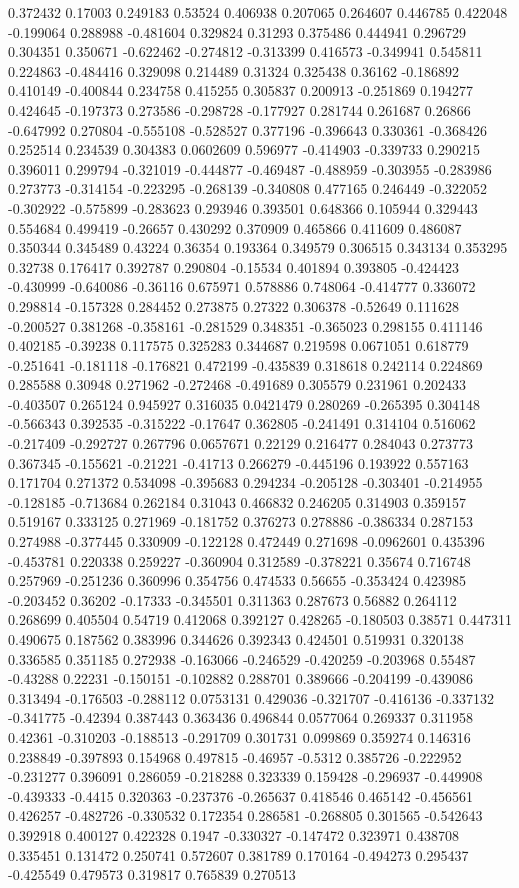 0.372432 0.17003 0.249183 0.53524 0.406938 0.207065 0.264607 0.446785 0.422048 -0.199064 0.288988 -0.481604 0.329824 0.31293 0.375486 0.444941 0.296729 0.304351 0.350671 -0.622462 -0.274812 -0.313399 0.416573 -0.349941 0.545811 0.224863 -0.484416 0.329098 0.214489 0.31324 0.325438 0.36162 -0.186892 0.410149 -0.400844 0.234758 0.415255 0.305837 0.200913 -0.251869 0.194277 0.424645 -0.197373 0.273586 -0.298728 -0.177927 0.281744 0.261687 0.26866 -0.647992 0.270804 -0.555108 -0.528527 0.377196 -0.396643 0.330361 -0.368426 0.252514 0.234539 0.304383 0.0602609 0.596977 -0.414903 -0.339733 0.290215 0.396011 0.299794 -0.321019 -0.444877 -0.469487 -0.488959 -0.303955 -0.283986 0.273773 -0.314154 -0.223295 -0.268139 -0.340808 0.477165 0.246449 -0.322052 -0.302922 -0.575899 -0.283623 0.293946 0.393501 0.648366 0.105944 0.329443 0.554684 0.499419 -0.26657 0.430292 0.370909 0.465866 0.411609 0.486087 0.350344 0.345489 0.43224 0.36354 0.193364 0.349579 0.306515 0.343134 0.353295 0.32738 0.176417 0.392787 0.290804 -0.15534 0.401894 0.393805 -0.424423 -0.430999 -0.640086 -0.36116 0.675971 0.578886 0.748064 -0.414777 0.336072 0.298814 -0.157328 0.284452 0.273875 0.27322 0.306378 -0.52649 0.111628 -0.200527 0.381268 -0.358161 -0.281529 0.348351 -0.365023 0.298155 0.411146 0.402185 -0.39238 0.117575 0.325283 0.344687 0.219598 0.0671051 0.618779 -0.251641 -0.181118 -0.176821 0.472199 -0.435839 0.318618 0.242114 0.224869 0.285588 0.30948 0.271962 -0.272468 -0.491689 0.305579 0.231961 0.202433 -0.403507 0.265124 0.945927 0.316035 0.0421479 0.280269 -0.265395 0.304148 -0.566343 0.392535 -0.315222 -0.17647 0.362805 -0.241491 0.314104 0.516062 -0.217409 -0.292727 0.267796 0.0657671 0.22129 0.216477 0.284043 0.273773 0.367345 -0.155621 -0.21221 -0.41713 0.266279 -0.445196 0.193922 0.557163 0.171704 0.271372 0.534098 -0.395683 0.294234 -0.205128 -0.303401 -0.214955 -0.128185 -0.713684 0.262184 0.31043 0.466832 0.246205 0.314903 0.359157 0.519167 0.333125 0.271969 -0.181752 0.376273 0.278886 -0.386334 0.287153 0.274988 -0.377445 0.330909 -0.122128 0.472449 0.271698 -0.0962601 0.435396 -0.453781 0.220338 0.259227 -0.360904 0.312589 -0.378221 0.35674 0.716748 0.257969 -0.251236 0.360996 0.354756 0.474533 0.56655 -0.353424 0.423985 -0.203452 0.36202 -0.17333 -0.345501 0.311363 0.287673 0.56882 0.264112 0.268699 0.405504 0.54719 0.412068 0.392127 0.428265 -0.180503 0.38571 0.447311 0.490675 0.187562 0.383996 0.344626 0.392343 0.424501 0.519931 0.320138 0.336585 0.351185 0.272938 -0.163066 -0.246529 -0.420259 -0.203968 0.55487 -0.43288 0.22231 -0.150151 -0.102882 0.288701 0.389666 -0.204199 -0.439086 0.313494 -0.176503 -0.288112 0.0753131 0.429036 -0.321707 -0.416136 -0.337132 -0.341775 -0.42394 0.387443 0.363436 0.496844 0.0577064 0.269337 0.311958 0.42361 -0.310203 -0.188513 -0.291709 0.301731 0.099869 0.359274 0.146316 0.238849 -0.397893 0.154968 0.497815 -0.46957 -0.5312 0.385726 -0.222952 -0.231277 0.396091 0.286059 -0.218288 0.323339 0.159428 -0.296937 -0.449908 -0.439333 -0.4415 0.320363 -0.237376 -0.265637 0.418546 0.465142 -0.456561 0.426257 -0.482726 -0.330532 0.172354 0.286581 -0.268805 0.301565 -0.542643 0.392918 0.400127 0.422328 0.1947 -0.330327 -0.147472 0.323971 0.438708 0.335451 0.131472 0.250741 0.572607 0.381789 0.170164 -0.494273 0.295437 -0.425549 0.479573 0.319817 0.765839 0.270513 